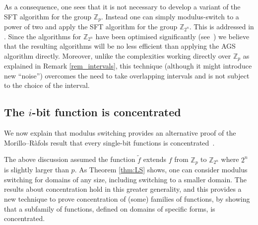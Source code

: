 \documentclass[11pt]{article}
\theoremstyle{definition}
\newcommand{\Z}{\mathbb{Z}}
\begin{document}
As a consequence, one sees that it is not necessary to develop a variant of the SFT algorithm for the group $\Z_p$. Instead one can simply modulus-switch to a power of two and apply the SFT algorithm for the group $\Z_{2^n}$. This is addressed in \cite[Section 6.1]{LS}.
Since the algorithms for $\Z_{2^n}$ have been optimised significantly (see~\cite{Fourier_survey,ManSah}) we believe that the resulting algorithms will be no less efficient than applying the AGS algorithm directly. Moreover, unlike the complexities working directly over $\Z_p$ as explained in Remark \ref{rem_intervals}, this technique (although it might introduce new ``noise'') overcomes the need to take overlapping intervals and is not subject to the choice of the interval.



\subsection{The $i$-bit function is concentrated} \label{sec:i-th-bit}

We now explain that modulus switching provides an alternative proof of the Morillo--R{\` a}fols result that every single-bit functions is concentrated~\cite{MR}.

The above discussion assumed the function $\widetilde{f}$ extends $f$ from $\Z_p$ to $\Z_{2^n}$ where $2^n$ is slightly larger than $p$. As Theorem \ref{thm:LS} shows, one can consider modulus switching for domains of any size, including switching to a smaller domain.
The results about concentration hold in this greater generality, and this provides a new technique to prove concentration of (some) families of functions, by showing that a subfamily of functions, defined on domains of specific forms, is concentrated.
\end{document}
